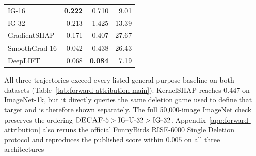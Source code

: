 \begin{table}[!t]
\begin{minipage}[t]{0.395\textwidth}
{\begin{tabular}{lrrr}
IG-16
& \textbf{0.222}
& 0.710
& 9.01
\\

IG-32
& 0.213
& 1.425
& 13.39
\\

GradientSHAP
& 0.171
& 0.407
& 27.67
\\

SmoothGrad-16
& 0.042
& 0.438
& 26.43
\\

DeepLIFT
& 0.068
& \textbf{0.084}
& 7.19
\\

\bottomrule
\end{tabular}
}

\vspace{0.45em}


\label{tab:endpoint-trajectory-main}

\centering
\setlength{\tabcolsep}{3.5pt}


\end{minipage}

\end{table}

All three \decaf trajectories exceed every listed general-purpose baseline on
both datasets (Table~\ref{tab:forward-attribution-main}). KernelSHAP reaches
$0.447$ on ImageNet-1k, but it directly queries the same deletion game used to
define that target and is therefore shown separately. The full 50,000-image
ImageNet check preserves the ordering
$\textsc{DECAF}\text{-}5>\mathrm{IG\text{-}U\text{-}32}>\mathrm{IG\text{-}32}$.
Appendix~\ref{app:forward-attribution} also reruns the official FunnyBirds
RISE-6000 Single Deletion protocol and reproduces the published score
within $0.005$ on all three architectures~\citep{hesse2023funnybirds}

